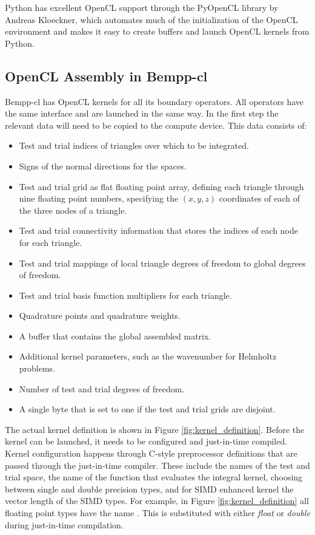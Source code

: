 Python has excellent OpenCL support through the PyOpenCL library by Andreas Kloeckner, which automates much of the initialization of the OpenCL environment and makes it easy to create buffers and launch OpenCL kernels from Python.

\subsection{OpenCL Assembly in Bempp-cl}

\begin{figure*}
	\center
	
	\caption{Definition of the OpenCL compute kernel for scalar integral equations.}
	\label{fig:kernel_definition}
\end{figure*}


Bempp-cl has OpenCL kernels for all its boundary operators. All operators have the same interface and are launched in the same way. In the first step the relevant data will need to be copied to the compute device. This data consists of:

\begin{itemize}
	\item Test and trial indices of triangles over which to be integrated.
	\item Signs of the normal directions for the spaces.
	\item Test and trial grid as flat floating point array, defining each triangle through nine floating point numbers, specifying the $(x, y, z)$ coordinates of each of the three nodes of a triangle.
	\item Test and trial connectivity information that stores the indices of each node for each triangle.
	\item Test and trial mappings of local triangle degrees of freedom to global degrees of freedom.
	\item Test and trial basis function multipliers for each triangle.
	\item Quadrature points and quadrature weights.
	\item A buffer that contains the global assembled matrix.
	\item Additional kernel parameters, such as the wavenumber for Helmholtz problems.
	\item Number of test and trial degrees of freedom.
	\item A single byte that is set to one if the test and trial grids are disjoint.
\end{itemize}
The actual kernel definition is shown in Figure \ref{fig:kernel_definition}.
Before the kernel can be launched, it needs to be configured and just-in-time compiled. Kernel configuration happens through C-style preprocessor definitions that are passed through the just-in-time compiler. These include the names of the test and trial space, the name of the function that evaluates the integral kernel, choosing between single and double precision types, and for SIMD enhanced kernel the vector length of the SIMD types.
For example, in Figure \ref{fig:kernel_definition} all floating point types have the name . This is substituted with either \textit{float} or \textit{double} during just-in-time compilation.

